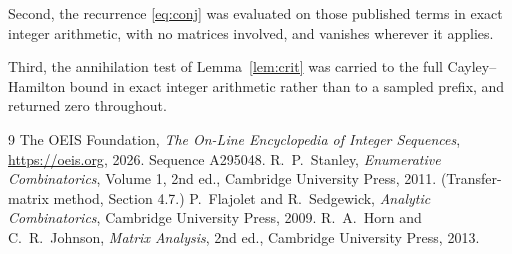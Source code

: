 \documentclass[11pt,a4paper]{article}
\theoremstyle{plain}
\theoremstyle{definition}
\begin{document}
Second, the recurrence \eqref{eq:conj} was evaluated on those published terms in exact
integer arithmetic, with no matrices involved, and vanishes wherever it applies.

Third, the annihilation test of Lemma~\ref{lem:crit} was carried to the full
Cayley--Hamilton bound in exact integer arithmetic rather than to a sampled prefix, and
returned zero throughout.

\begin{thebibliography}{9}
 The OEIS Foundation, \emph{The On-Line Encyclopedia of Integer
Sequences}, \url{https://oeis.org}, 2026. Sequence A295048.
 R.~P.~Stanley, \emph{Enumerative Combinatorics}, Volume 1, 2nd ed.,
Cambridge University Press, 2011. (Transfer-matrix method, Section 4.7.)
 P.~Flajolet and R.~Sedgewick, \emph{Analytic Combinatorics}, Cambridge
University Press, 2009.
 R.~A.~Horn and C.~R.~Johnson, \emph{Matrix Analysis}, 2nd ed., Cambridge
University Press, 2013.
\end{thebibliography}
\end{document}
